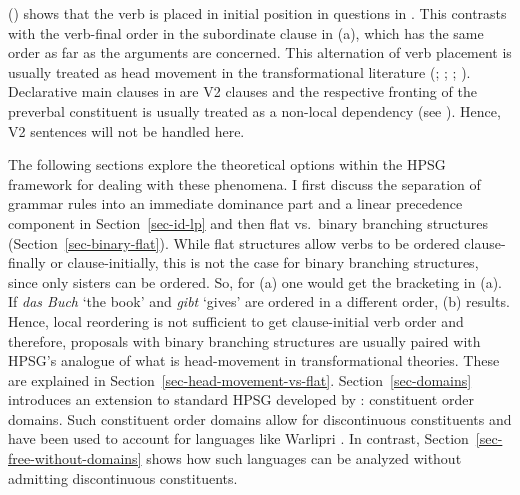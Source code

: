 \documentclass[output=paper]{langsci/langscibook}
\begin{document}
() shows that the verb is placed in initial position in questions in . This contrasts
with the verb-final order in the subordinate clause in (a), which has the same order as far
as the arguments are concerned. This alternation of verb placement is usually treated as
head movement in the transformational literature (\citealp{Bach62a}; \citealp*[]{Bierwisch63};
\citealp{Reis74a}; \citealp[Chapter~1]{Thiersch78a}). Declarative main clauses in  are V2
clauses and the respective fronting of the preverbal constituent is usually treated as a non-local dependency (see
). Hence, V2 sentences will not be handled here.

The following sections explore the theoretical options within the HPSG framework for dealing with
these phenomena. I first discuss the separation of grammar rules into an immediate dominance part and
a linear precedence component in Section~\ref{sec-id-lp} and then flat vs.\ binary branching
structures (Section~\ref{sec-binary-flat}). While flat structures allow verbs to be ordered clause-finally
or clause-initially, this is not the case for binary branching structures, since only sisters can be
ordered. So, for (a) one would get the bracketing in (a). If \emph{das Buch} `the
book' and \emph{gibt} `gives' are ordered in a different order, (b) results.
\eal
{}
\zl
Hence, local reordering is not sufficient to get clause-initial verb order and therefore, proposals with binary branching
structures are usually paired with HPSG's analogue of what is head-movement in transformational
theories. These are explained in Section~\ref{sec-head-movement-vs-flat}. Section~\ref{sec-domains} introduces an extension to
standard HPSG developed by \citet{Reape94a}: constituent order domains. Such constituent
order domains allow for discontinuous constituents and have been used to account for languages like Warlipri
\citep{DS99a}. In contrast, Section~\ref{sec-free-without-domains} shows how such languages can be analyzed without admitting discontinuous constituents.
\end{document}
